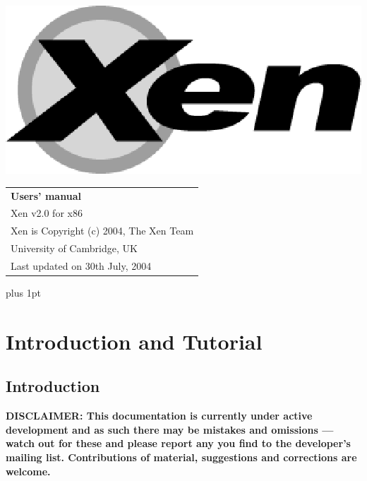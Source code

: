 \documentclass[11pt,twoside,final,openright]{xenstyle}
\begin{document}
\pagestyle{empty}
\begin{center}
\vspace*{\fill}
\includegraphics{eps/xenlogo.eps}
\vfill
\vfill
\vfill
\begin{tabular}{l}
{\Huge \bf Users' manual} \\[4mm]
{\huge Xen v2.0 for x86} \\[80mm]

{\Large Xen is Copyright (c) 2004, The Xen Team} \\[3mm]
{\Large University of Cambridge, UK} \\[20mm]
{\large Last updated on 30th July, 2004}
\end{tabular}
\vfill
\end{center}
\cleardoublepage

\pagestyle{plain}
{ \parskip 0pt plus 1pt
  \tableofcontents }
\cleardoublepage

\raggedbottom
{}
\parindent=0pt
\renewcommand{\topfraction}{.8}
\renewcommand{\bottomfraction}{.8}
\renewcommand{\textfraction}{.2}
\renewcommand{\floatpagefraction}{.8}

\newcommand{\path}[1]{{\tt #1}}

\part{Introduction and Tutorial}
\chapter{Introduction}

{\bf
DISCLAIMER: This documentation is currently under active development
and as such there may be mistakes and omissions --- watch out for
these and please report any you find to the developer's mailing list.
Contributions of material, suggestions and corrections are welcome.
}
\end{document}
